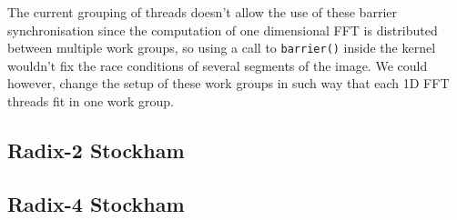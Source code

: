 \documentclass[
  oneside,
  11pt, a4paper,
  footinclude=true,
  headinclude=true,
  cleardoublepage=empty
]{scrbook}
\begin{document}
The current grouping of threads doesn't allow the use of these barrier synchronisation since the computation of one dimensional FFT is distributed between multiple work groups, so using a call to \texttt{barrier()} inside the kernel wouldn't fix the race conditions of several segments of the image. We could however, change the setup of these work groups in such way that each 1D FFT threads fit in one work group. 



\subsection{Radix-2 Stockham}

\subsection{Radix-4 Stockham}
\end{document}
